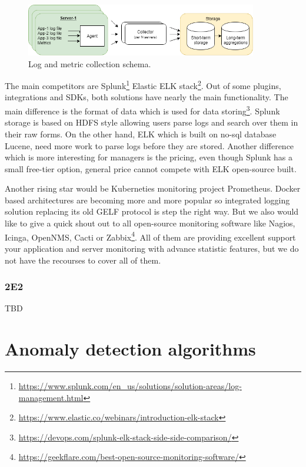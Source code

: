 \begin{figure}[h]
    \centering
    \includegraphics[width=0.9\textwidth]{figures/stateOfTheArt/logCollectionSchema.png}
    \caption{Log and metric collection schema.}
    \label{fig:sota_logCollection_schema}
\end{figure}

The main competitors are Splunk\footnote{\url{https://www.splunk.com/en_us/solutions/solution-areas/log-management.html}} Elastic ELK stack\footnote{\url{https://www.elastic.co/webinars/introduction-elk-stack}}. Out of some plugins, integrations and SDKs, both solutions have nearly the main functionality. The main difference is the format of data which is used for data storing\footnote{\url{https://devops.com/splunk-elk-stack-side-side-comparison/}}. Splunk storage is based on HDFS \cite{sanjay2003google, shvachko2010hadoop} style allowing users parse logs and search over them in their raw forms. On the other hand, ELK which is built on no-sql database Lucene, need more work to parse logs before they are stored. Another difference which is more interesting for managers is the pricing, even though Splunk has a small free-tier option,  general price cannot compete with ELK open-source built. 

Another rising star would be Kuberneties monitoring project Prometheus. Docker based architectures are becoming more and more popular so integrated logging solution replacing its old GELF protocol is  step the right way. But we also would like to give a quick shout out to all open-source monitoring software like Nagios, Icinga, OpenNMS, Cacti or Zabbix\footnote{\url{https://geekflare.com/best-open-source-monitoring-software/}}. All of them are providing excellent support  your application and server monitoring with advance statistic features, but we do not have the recourses to cover all of them.

\subsubsection{2E2}

TBD

\section{Anomaly detection algorithms}

